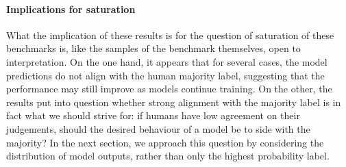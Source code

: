 \paragraph{Implications for saturation}
What the implication of these results is for the question of saturation of these benchmarks is, like the samples of the benchmark themselves, open to interpretation.
On the one hand, it appears that for several cases, the model predictions do not align with the human majority label, suggesting that the performance may still improve as models continue training.
On the other, the results put into question whether strong alignment with the majority label is in fact what we should strive for: if humans have low agreement on their judgements, should the desired behaviour of a model be to side with the majority?
In the next section, we approach this question by considering the distribution of model outputs, rather than only the highest probability label.

% 
% 

